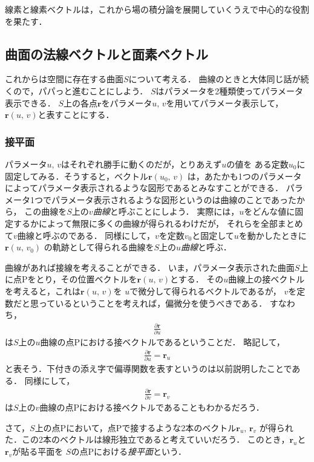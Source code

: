 線素と線素ベクトルは，これから場の積分論を展開していくうえで中心的な役割を果たす．

\subsection{曲面の法線ベクトルと面素ベクトル}

これからは空間に存在する曲面$S$について考える．
曲線のときと大体同じ話が続くので，パパっと進むことにしよう．
$S$はパラメータを2種類使ってパラメータ表示できる．
$S$上の各点$\bm{r}$をパラメータ$u, \, v$を用いてパラメータ表示して，
$\bm{r}(u, \, v)$と表すことにする．

\subsubsection{接平面}
パラメータ$u, \, v$はそれぞれ勝手に動くのだが，とりあえず$u$の値を
ある定数$u_0$に固定してみる．そうすると，ベクトル$\bm{r}(u_0, \, v)$
は，あたかも1つのパラメータによってパラメータ表示されるような図形であるとみなすことができる．
パラメータ1つでパラメータ表示されるような図形というのは曲線のことであったから，
この曲線を$S$上の\emph{$v$曲線}と呼ぶことにしよう．
実際には，$u$をどんな値に固定するかによって無限に多くの曲線が得られるわけだが，
それらを全部まとめて$v$曲線と呼ぶのである．
同様にして，$v$を定数$v_0$と固定して$u$を動かしたときに$\bm{r}(u, \, v_0)$
の軌跡として得られる曲線を$S$上の\emph{$u$曲線}と呼ぶ．

曲線があれば接線を考えることができる．
いま，パラメータ表示された曲面$S$上に点Pをとり，その位置ベクトルを$\bm{r}(u, \, v)$とする．
その$u$曲線上の接ベクトルを考えると，これは$\bm{r}(u, \, v)$を
$u$で微分して得られるベクトルであるが，
$v$を定数だと思っているということを考えれば，偏微分を使うべきである．
すなわち，
\begin{align*}
\frac{ \partial \bm{r} } {\partial u} 
\end{align*}
は$S$上の$u$曲線の点Pにおける接ベクトルであるということだ．
略記して，
\begin{align*}
\frac{ \partial \bm{r} } {\partial u} = \bm{r}_u
\end{align*}
と表そう．下付きの添え字で偏導関数を表すというのは以前説明したことである．
同様にして，
\begin{align*}
\frac{ \partial \bm{r} } {\partial v} = \bm{r}_v
\end{align*}
は$S$上の$v$曲線の点Pにおける接ベクトルであることもわかるだろう．

さて，$S$上の点Pにおいて，点Pで接するような2本のベクトル$\bm{r}_u, \, \bm{r}_v$
が得られた．この2本のベクトルは線形独立であると考えていいだろう．
このとき，$\bm{r}_u$と$\bm{r}_v$が貼る平面を
$S$の点Pにおける\emph{接平面}という．

